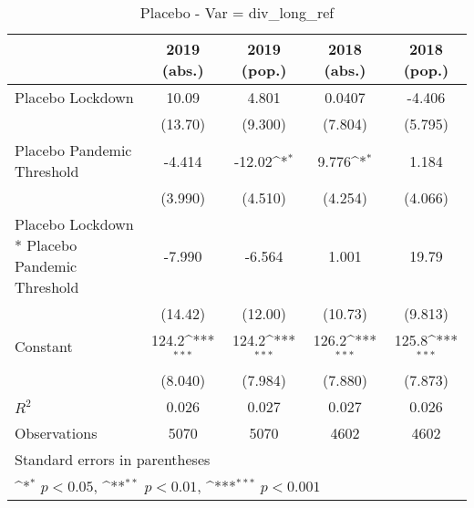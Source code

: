 \documentclass{article}
\begin{document}
{
\def\sym#1{\ifmmode^{#1}\else\(^{#1}\)\fi}
\begin{longtable}{l*{4}{c}}
\caption{Placebo - Var = div\_long\_ref}\\
\hline\hline\endfirsthead\hline\endhead\hline\endfoot\endlastfoot
                &\multicolumn{1}{c}{2019 (abs.)}&\multicolumn{1}{c}{2019 (pop.)}&\multicolumn{1}{c}{2018 (abs.)}&\multicolumn{1}{c}{2018 (pop.)}\\
\hline
Placebo Lockdown&    10.09         &    4.801         &   0.0407         &   -4.406         \\
                &  (13.70)         &  (9.300)         &  (7.804)         &  (5.795)         \\
Placebo Pandemic Threshold&   -4.414         &   -12.02\sym{*}  &    9.776\sym{*}  &    1.184         \\
                &  (3.990)         &  (4.510)         &  (4.254)         &  (4.066)         \\
Placebo Lockdown * Placebo Pandemic Threshold&   -7.990         &   -6.564         &    1.001         &    19.79         \\
                &  (14.42)         &  (12.00)         &  (10.73)         &  (9.813)         \\
Constant        &    124.2\sym{***}&    124.2\sym{***}&    126.2\sym{***}&    125.8\sym{***}\\
                &  (8.040)         &  (7.984)         &  (7.880)         &  (7.873)         \\
\hline
\(R^{2}\)       &    0.026         &    0.027         &    0.027         &    0.026         \\
Observations    &     5070         &     5070         &     4602         &     4602         \\
\hline\hline
\multicolumn{5}{l}{\footnotesize Standard errors in parentheses}\\
\multicolumn{5}{l}{\footnotesize \sym{*} \(p<0.05\), \sym{**} \(p<0.01\), \sym{***} \(p<0.001\)}\\
\end{longtable}
}
\end{document}
